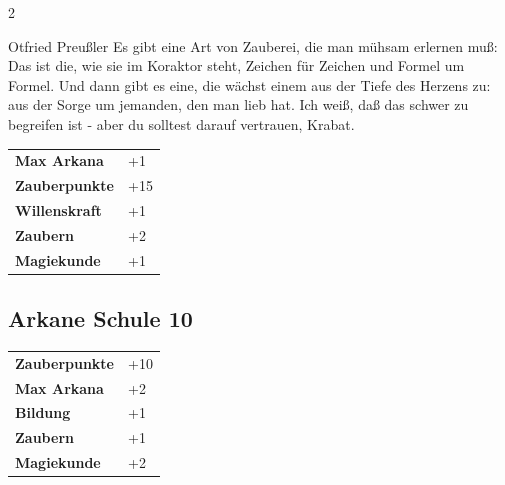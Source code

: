 \begin{multicols}{2}
\begin{tcolorbox}
\begin{pquote}{Otfried Preußler}
Es gibt eine Art von Zauberei, die man mühsam erlernen muß: Das ist die, wie sie im Koraktor steht, Zeichen für Zeichen und Formel um Formel. Und dann gibt es eine, die wächst einem aus der Tiefe des Herzens zu: aus der Sorge um jemanden, den man lieb hat. Ich weiß, daß das schwer zu begreifen ist - aber du solltest darauf vertrauen, Krabat.
\end{pquote}

\vspace{3mm}

\begin{tabular}{@{}ll@{}}
    \textbf{Max Arkana} & +1\\
    \textbf{Zauberpunkte} & +15\\
    \textbf{Willenskraft} & +1\\
    \textbf{Zaubern} & +2\\
    \textbf{Magiekunde} & +1\\
\end{tabular}


\end{tcolorbox}

\begin{tcolorbox}
    \subsection*{Arkane Schule \hfill \small{10 }}
    \tcblower




\begin{tabular}{@{}ll@{}}
    \textbf{Zauberpunkte} & +10\\
    \textbf{Max Arkana} & +2\\
    \textbf{Bildung} & +1\\
    \textbf{Zaubern} & +1\\
    \textbf{Magiekunde} & +2\\
\end{tabular}


\end{tcolorbox}

\begin{tcolorbox}

\end{tcolorbox}
\end{multicols}
